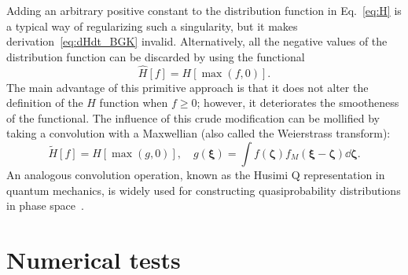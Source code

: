 \documentclass{article}
\newcommand{\bxi}{\boldsymbol{\xi}}
\newcommand{\bzeta}{\boldsymbol{\zeta}}
\begin{document}
Adding an arbitrary positive constant to the distribution function in Eq.~\eqref{eq:H} is a typical way
of regularizing such a singularity, but it makes derivation~\eqref{eq:dHdt_BGK} invalid.
Alternatively, all the negative values of the distribution function can be discarded by using the functional
\begin{equation}\label{eq:H_discarded}
    \hat{H}[f] = H[\max(f,0)].
\end{equation}
The main advantage of this primitive approach is that it does not alter the definition of the $H$ function
when $f\geq0$; however, it deteriorates the smootheness of the functional.
The influence of this crude modification can be mollified by taking a convolution with a Maxwellian
(also called the Weierstrass transform):
\begin{equation}\label{eq:H_blurred}
    \tilde{H}[f] = H[\max(g,0)], \quad g(\bxi) = \int f(\bzeta)f_M(\bxi-\bzeta)\dd\bzeta.
\end{equation}
An analogous convolution operation, known as the Husimi Q representation in quantum mechanics,
is widely used for constructing quasiprobability distributions in phase space~\cite{husimi1940some}.

\section{Numerical tests}
\end{document}
